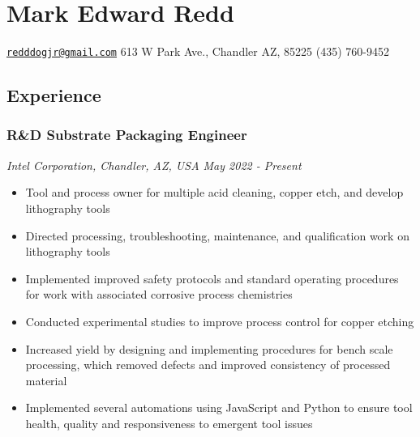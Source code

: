 

\section{Mark Edward Redd}\label{mark-edward-redd}

\href{mailto:redddogjr@gmail.com}{\nolinkurl{redddogjr@gmail.com}}
\textbar{} 613 W Park Ave., Chandler AZ, 85225 \textbar{} (435) 760-9452


\subsection{Experience}\label{experience}

\subsubsection{R\&D Substrate Packaging
Engineer}\label{rd-substrate-packaging-engineer}

\emph{Intel Corporation, Chandler, AZ, USA \textbar{} May 2022 -
Present}

\begin{itemize}
\tightlist
\item
  Tool and process owner for multiple acid cleaning, copper etch, and
  develop lithography tools
\item
  Directed processing, troubleshooting, maintenance, and qualification
  work on lithography tools
\item
  Implemented improved safety protocols and standard operating
  procedures for work with associated corrosive process chemistries
\item
  Conducted experimental studies to improve process control for copper
  etching
\item
  Increased yield by designing and implementing procedures for bench
  scale processing, which removed defects and improved consistency of
  processed material
\item
  Implemented several automations using JavaScript and Python to ensure
  tool health, quality and responsiveness to emergent tool issues
\end{itemize}

